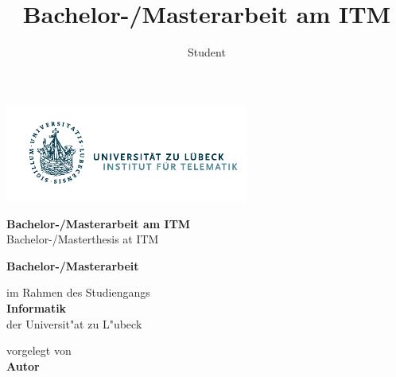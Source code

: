 \documentclass[
	ngerman,
	11pt,
	twoside,
	a4paper,
	headsepline,
	footsepline, 
	toc=bib
]{scrbook}
\begin{document}
\begin{titlepage}

\title{Bachelor-/Masterarbeit am ITM}
\author{Student}

{\Large
	\includegraphics[width=80mm]{images/Logo_Inst_Telematik_cropped.pdf}
	\vskip 44pt


	\textbf{\LARGE Bachelor-/Masterarbeit am ITM}\\
	\LARGE Bachelor-/Masterthesis at ITM

	\titlepageskip
	\textbf{Bachelor-/Masterarbeit}

	\titlepageskip
	im Rahmen des Studiengangs\\
	\textbf{Informatik}\\
	der Universit"at zu L"ubeck

	\titlepageskip
	vorgelegt von\\
	\textbf{Autor}

}
\end{titlepage}
\end{document}
